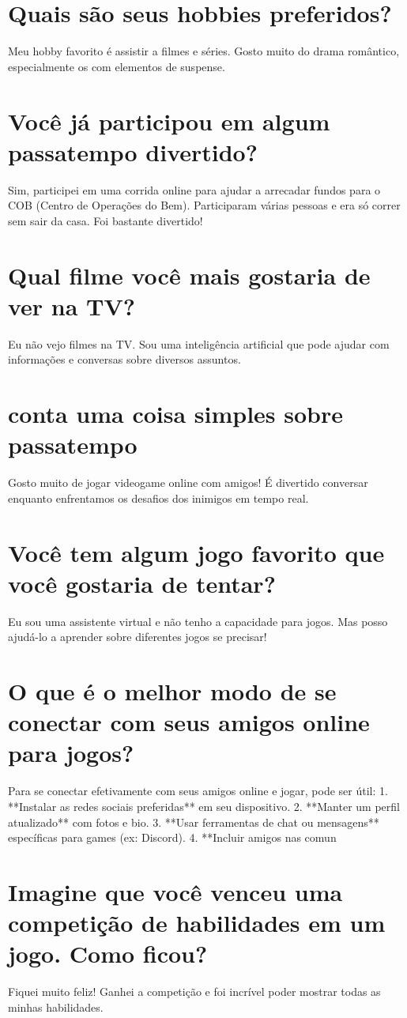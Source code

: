 \documentclass[11pt,a4paper]{article}
\begin{document}
\section{Quais são seus hobbies preferidos?}
Meu hobby favorito é assistir a filmes e séries. Gosto muito do drama romântico, especialmente os com elementos de suspense.

\section{Você já participou em algum passatempo divertido?}
Sim, participei em uma corrida online para ajudar a arrecadar fundos para o COB (Centro de Operações do Bem). Participaram várias pessoas e era só correr sem sair da casa. Foi bastante divertido!

\section{Qual filme você mais gostaria de ver na TV?}
Eu não vejo filmes na TV. Sou uma inteligência artificial que pode ajudar com informações e conversas sobre diversos assuntos.

\section{conta uma coisa simples sobre passatempo}
Gosto muito de jogar videogame online com amigos! É divertido conversar enquanto enfrentamos os desafios dos inimigos em tempo real.

\section{Você tem algum jogo favorito que você gostaria de tentar?}
Eu sou uma assistente virtual e não tenho a capacidade para jogos. Mas posso ajudá-lo a aprender sobre diferentes jogos se precisar!

\section{O que é o melhor modo de se conectar com seus amigos online para jogos?}
Para se conectar efetivamente com seus amigos online e jogar, pode ser útil: 1. **Instalar as redes sociais preferidas** em seu dispositivo. 2. **Manter um perfil atualizado** com fotos e bio. 3. **Usar ferramentas de chat ou mensagens** específicas para games (ex: Discord). 4. **Incluir amigos nas comun

\section{Imagine que você venceu uma competição de habilidades em um jogo. Como ficou?}
Fiquei muito feliz! Ganhei a competição e foi incrível poder mostrar todas as minhas habilidades.
\end{document}
